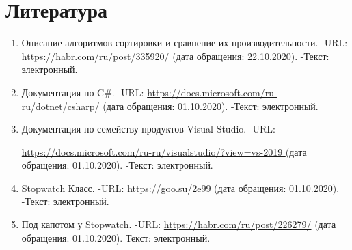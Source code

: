 \documentclass[14pt, a4paper]{extarticle}
\begin{document}
\clearpage
\section*{Литература}
\begin{enumerate}
	\label{literature}
	\item Описание алгоритмов сортировки и сравнение их производительности. -URL: \href{https://habr.com/ru/post/335920/}{https://habr.com/ru/post/335920/} (дата обращения: 22.10.2020). -Текст: электронный.
	\item  Документация по C\#. -URL: \href{https://docs.microsoft.com/ru-ru/dotnet/csharp/}{https://docs.microsoft.com/ru-ru/dotnet/csharp/} (дата обращения: 01.10.2020). -Текст: электронный.
	\item Документация по семейству продуктов Visual Studio. -URL:\par \href{https://docs.microsoft.com/ru-ru/visualstudio/?view=vs-2019}{https://docs.microsoft.com/ru-ru/visualstudio/?view=vs-2019 } (дата обращения: 01.10.2020). -Текст: электронный.
	\item Stopwatch Класс. -URL: \href{https://goo.su/2e99}{https://goo.su/2e99 } (дата обращения: 01.10.2020). -Текст: электронный.
	\item Под капотом у Stopwatch. -URL:  \href{https://habr.com/ru/post/226279/}{https://habr.com/ru/post/226279/} (дата обращения: 01.10.2020). Текст: электронный.
\end{enumerate}
\end{document}
